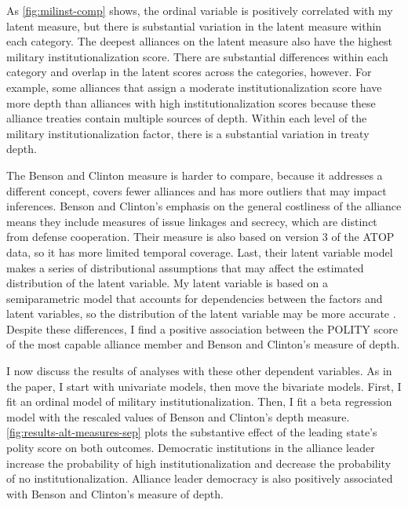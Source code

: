 \documentclass[12pt]{article}
\begin{document}
As \autoref{fig:milinst-comp} shows, the ordinal variable is positively correlated with my latent measure, but there is substantial variation in the latent measure within each category. 
The deepest alliances on the latent measure also have the highest military institutionalization score.
There are substantial differences within each category and overlap in the latent scores across the categories, however. 
For example, some alliances that \citet{LeedsAnac2005} assign a moderate institutionalization score have more depth than alliances with high institutionalization scores because these alliance treaties contain multiple sources of depth. 
Within each level of the military institutionalization factor, there is a substantial variation in treaty depth. 


The Benson and Clinton measure is harder to compare, because it addresses a different concept, covers fewer alliances and has more outliers that may impact inferences.
Benson and Clinton's emphasis on the general costliness of the alliance means they include measures of issue linkages and secrecy, which are distinct from defense cooperation. 
Their measure is also based on version 3 of the ATOP data, so it has more limited temporal coverage. 
Last, their latent variable model makes a series of distributional assumptions that may affect the estimated distribution of the latent variable. 
My latent variable is based on a semiparametric model that accounts for dependencies between the factors and latent variables, so the distribution of the latent variable may be more accurate \citep{Murrayetal2013}.
Despite these differences, I find a positive association between the POLITY score of the most capable alliance member and Benson and Clinton's measure of depth. 


I now discuss the results of analyses with these other dependent variables. 
As in the paper, I start with univariate models, then move the bivariate models. 
First, I fit an ordinal model of military institutionalization. 
Then, I fit a beta regression model with the rescaled values of Benson and Clinton's depth measure. 
\autoref{fig:results-alt-measures-sep} plots the substantive effect of the leading state's polity score on both outcomes. 
Democratic institutions in the alliance leader increase the probability of high institutionalization and decrease the probability of no institutionalization. 
Alliance leader democracy is also positively associated with Benson and Clinton's measure of depth. 
\end{document}
